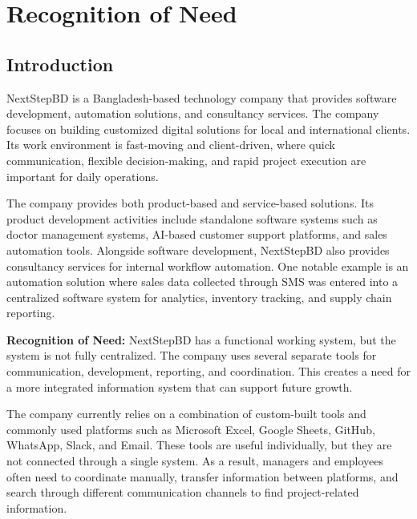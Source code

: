 \documentclass[12pt,a4paper]{report}
\begin{document}
\restoregeometry
\clearpage
\tableofcontents
\listoffigures
\listoftables
\newpage

\chapter{Recognition of Need}

\section{Introduction}

NextStepBD is a Bangladesh-based technology company that provides software development, automation solutions, and consultancy services. The company focuses on building customized digital solutions for local and international clients. Its work environment is fast-moving and client-driven, where quick communication, flexible decision-making, and rapid project execution are important for daily operations.

The company provides both product-based and service-based solutions. Its product development activities include standalone software systems such as doctor management systems, AI-based customer support platforms, and sales automation tools. Alongside software development, NextStepBD also provides consultancy services for internal workflow automation. One notable example is an automation solution where sales data collected through SMS was entered into a centralized software system for analytics, inventory tracking, and supply chain reporting.

\begin{highlightBox}
\textbf{Recognition of Need:} NextStepBD has a functional working system, but the system is not fully centralized. The company uses several separate tools for communication, development, reporting, and coordination. This creates a need for a more integrated information system that can support future growth.
\end{highlightBox}

The company currently relies on a combination of custom-built tools and commonly used platforms such as Microsoft Excel, Google Sheets, GitHub, WhatsApp, Slack, and Email. These tools are useful individually, but they are not connected through a single system. As a result, managers and employees often need to coordinate manually, transfer information between platforms, and search through different communication channels to find project-related information.
\end{document}
